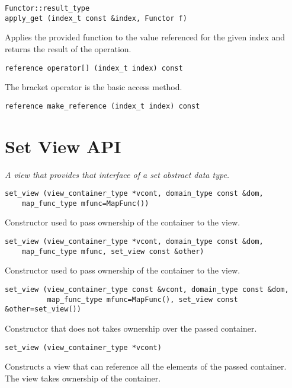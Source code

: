 \begin{verbatim}
Functor::result_type
apply_get (index_t const &index, Functor f)
\end{verbatim}

Applies the provided function to the value referenced for the given index and returns the result of the operation.

\begin{verbatim}
reference operator[] (index_t index) const
\end{verbatim}

The bracket operator is the basic access method.

\begin{verbatim}
reference make_reference (index_t index) const
\end{verbatim}

\section{Set View API } \label{sec-set-vw}

\emph{ A view that provides that interface of a set abstract data type.}

\begin{verbatim}
set_view (view_container_type *vcont, domain_type const &dom,
    map_func_type mfunc=MapFunc())
\end{verbatim}

Constructor used to pass ownership of the container to the view.

\begin{verbatim}
set_view (view_container_type *vcont, domain_type const &dom,
    map_func_type mfunc, set_view const &other)
\end{verbatim}

Constructor used to pass ownership of the container to the view.

\begin{verbatim}
set_view (view_container_type const &vcont, domain_type const &dom,
          map_func_type mfunc=MapFunc(), set_view const &other=set_view())
\end{verbatim}

Constructor that does not takes ownership over the passed container.

\begin{verbatim}
set_view (view_container_type *vcont)
\end{verbatim}

Constructs a view that can reference all the elements of the passed container. The view takes ownership of the container.

